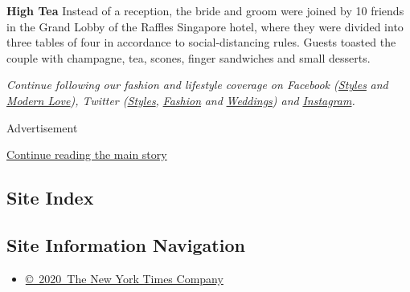 \textbf{High Tea} Instead of a reception, the bride and groom were
joined by 10 friends in the Grand Lobby of the Raffles Singapore hotel,
where they were divided into three tables of four in accordance to
social-distancing rules. Guests toasted the couple with champagne, tea,
scones, finger sandwiches and small desserts.

\emph{Continue following our fashion and lifestyle coverage on Facebook
(}\href{https://www.facebookcorewwwi.onion/nytimesstyles}{\emph{Styles}}
\emph{and}
\href{https://www.facebookcorewwwi.onion/modernlove}{\emph{Modern
Love}}\emph{), Twitter
(}\href{https://twitter.com/nytstyles}{\emph{Styles}}\emph{,}
\href{https://twitter.com/nytfashion}{\emph{Fashion}} \emph{and}
\href{https://twitter.com/nytimesvows}{\emph{Weddings}}\emph{) and}
\href{https://instagram.com/nytimesfashion}{\emph{Instagram}}\emph{.}

Advertisement

\protect\hyperlink{after-bottom}{Continue reading the main story}

\hypertarget{site-index}{%
\subsection{Site Index}\label{site-index}}

\hypertarget{site-information-navigation}{%
\subsection{Site Information
Navigation}\label{site-information-navigation}}

\begin{itemize}
\tightlist
\item
  \href{https://help.nytimes3xbfgragh.onion/hc/en-us/articles/115014792127-Copyright-notice}{©~2020~The
  New York Times Company}
\end{itemize}

